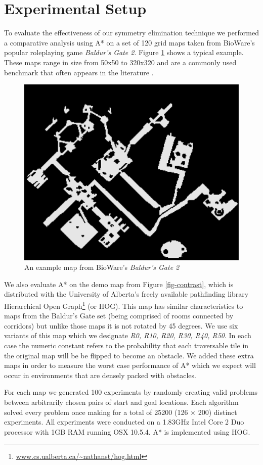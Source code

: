 \section{Experimental Setup}
To evaluate the effectiveness of our symmetry elimination technique we performed
a comparative analysis using A* on a set of 120 grid maps taken from BioWare's 
popular roleplaying game \emph{Baldur's Gate 2}. 
Figure \ref{fig-bgmap} shows a typical example.
These maps range in size from 50x50 to 320x320 and are a commonly used benchmark 
that often appears in the literature 
\cite{botea04,bjornsson05,bjornsson06,sturtevant05,harabor08}.
 \begin{figure}[b]
        \begin{center}
                        \includegraphics[width=0.8\columnwidth, trim = 10mm 10mm 10mm 0mm]{diagrams/bgmap.png}
        \end{center}
        \caption{An example map from BioWare's \emph{Baldur's Gate 2}}
        \label{fig-bgmap}
 \end{figure}
\par
We also evaluate A* on the demo map from Figure \ref{fig-contrast},
 which is distributed with the University of Alberta's freely available pathfinding library 
Hierarchical Open Graph\footnote{\url{www.cs.ualberta.ca/~nathanst/hog.html}} (or HOG).
This map has similar characteristics to maps from the Baldur's Gate set (being comprised of rooms
connected by corridors) but unlike those maps it is not rotated by 45 degrees. 
We use six variants of this map which we designate \emph{R0, R10, R20, R30, R40, R50}.
In each case the numeric constant refers to the probability that each traversable tile 
in the original map will be be flipped to become an obstacle.
We added these extra maps in order to measure the worst case performance of A* which we expect will occur in 
environments that are densely packed with obstacles.
\par
For each map we generated 100 experiments by randomly creating valid problems between arbitrarily chosen 
pairs of start and goal locations.
Each algorithm solved every problem once making for a total of 25200 (126 $\times$ 200) distinct experiments.
All experiments were conducted on a 1.83GHz Intel Core 2 Duo processor with 1GB RAM running OSX 10.5.4.
A* is implemented using HOG.
